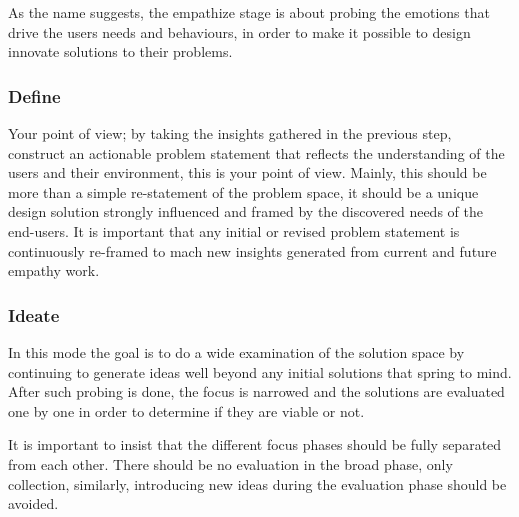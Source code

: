     As the name suggests, the empathize stage is about probing the emotions
    that drive the users needs and behaviours, in order to make it possible to
    design innovate solutions to their problems.



  \subsubsection{Define}

    Your point of view; by taking the insights gathered in the previous step,
    construct an actionable problem statement that reflects the understanding
    of the users and their environment, this is your point of view.
    Mainly, this should be more than a simple re-statement of the problem
    space, it should be a unique design solution strongly influenced and
    framed by the discovered needs of the end-users. It is important that any
    initial or revised problem statement is continuously re-framed to mach new
    insights generated from current and future empathy work.

  \subsubsection{Ideate}

    In this mode the goal is to do a wide examination of the solution space by
    continuing to generate ideas well beyond any initial solutions that spring
    to mind. After such probing is done, the focus is narrowed and the
    solutions are evaluated one by one in order to determine if they are
    viable or not. \\


    It is important to insist that the different focus phases should be fully
    separated from each other. There should be no evaluation in the broad
    phase, only collection, similarly, introducing new ideas during the
    evaluation phase should be avoided.


